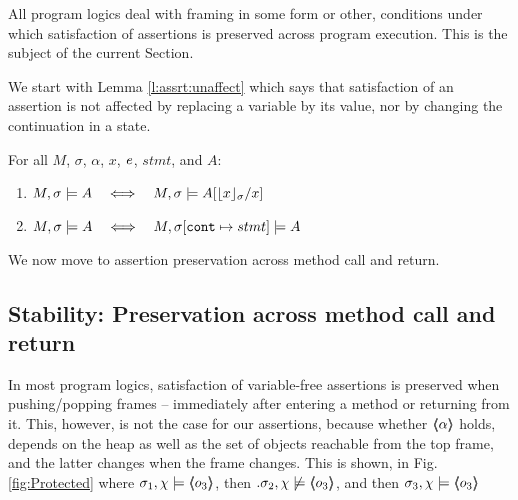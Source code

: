 All program logics deal with framing in some form or other, \ie conditions under which  satisfaction of  assertions is preserved across program execution. 
This is the subject of the current Section.

We start with  Lemma \ref{l:assrt:unaffect}  which says that satisfaction of an assertion is not affected by replacing a variable by its value, nor by changing the continuation in a state.


\begin{lemma}
\label{lemma:addr:expr}
\label{l:assrt:unaffect}
For all $M$, $\sigma$, $\alpha$, $x$, $\mathit{e}$, $stmt$, and $A$:

\begin{enumerate}
\item
\label{one:ad:exp}
$%
\satisfiesA{M}{\sigma}{A}   \ \ \ \Longleftrightarrow\ \ \ \satisfiesA{M}{\sigma}{A[{\interpret \sigma x}/x]}   $ 
\item
$ M , \sigma \models A   \ \ \ \Longleftrightarrow\ \ \ M , \sigma[\mbox{\normalfont{\texttt{cont}}}\mapsto stmt] \models A$ 
\end{enumerate}

\end{lemma}

 \noindent
We now move to assertion preservation across method call and return. %

\subsection{Stability: Preservation across method call and return}
\label{s:preserve:call:ret}
In most program logics, satisfaction of  variable-free assertions  is preserved when pushing/popping frames
-- \ie immediately after entering a method or  returning from it.
This, however, is not   the case for our assertions, because whether  $\langle\!\!\langle \alpha \rangle\!\!\rangle$ holds, depends on the heap as well as the set of objects reachable from the top frame, and
the latter  changes when the frame changes.
This is shown, \eg in  Fig. \ref{fig:Protected} where 
$\sigma_1,\chi \models \langle\!\!\langle o_3 \rangle\!\!\rangle$, then $.\sigma_2,\chi \not\models \langle\!\!\langle o_3 \rangle\!\!\rangle$, and then $\sigma_3,\chi  \models \langle\!\!\langle o_3 \rangle\!\!\rangle$

